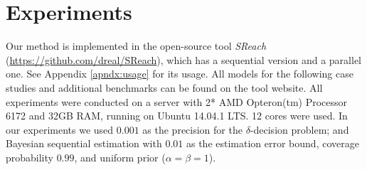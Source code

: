 \section{Experiments}
Our method is implemented in the open-source tool {\it SReach} (\url{https://github.com/dreal/SReach}), which has a sequential version and a parallel one. See Appendix \ref{apndx:usage} for its usage. All models for the following case studies and additional benchmarks can be found on the tool website. All experiments were conducted on a server with 2* AMD Opteron(tm) Processor 6172 and 32GB RAM, running on Ubuntu 14.04.1 LTS. 12 cores were used. In our experiments we used $0.001$ as the precision for the $\delta$-decision problem; and Bayesian sequential estimation with $0.01$ as the estimation error bound, coverage probability $0.99$, and uniform prior ($\alpha = \beta = 1$).

